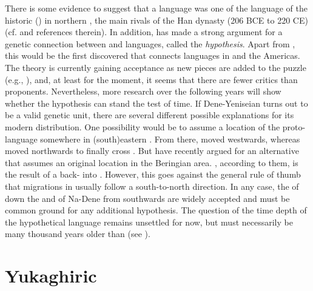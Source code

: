 There is some evidence to suggest that a  language was one of the language of the historic  () in northern , the main rivals of the Han dynasty (206 BCE to 220 CE) (cf. \citealt{VovinVajdadelaVaissière2016} and references therein). In addition, \citet{Vajda2010} has made a strong argument for a genetic connection between  and  languages, called the \textit{ hypothesis}. Apart from , this would be the first  discovered that connects languages in  and the Americas. The theory is currently gaining acceptance as new pieces are added to the puzzle (e.g., \citealt{Vajda2013}), and, at least for the moment, it seems that there are fewer critics than proponents. Nevertheless, more research over the following years will show whether the hypothesis can stand the test of time. If Dene-Yeniseian turns out to be a valid genetic unit, there are several different possible explanations for its modern distribution. One possibility would be to assume a location of the proto-language somewhere in (south)eastern . From there,  moved westwards, whereas  moved northwards to finally cross . But \citet{SicoliHolton2014} have recently argued for an alternative that assumes an original location in the Beringian area. , according to them, is the result of a back- into . However, this goes against the general rule of thumb that migrations in  usually follow a south-to-north direction. In any case, the  of  down the  and of Na-Dene from  southwards are widely accepted and must be common ground for any additional hypothesis. The question of the time depth of the hypothetical  language remains unsettled for now, but must necessarily be many thousand years older than  (see ).

\section{Yukaghiric}\label{sec:2.14}


